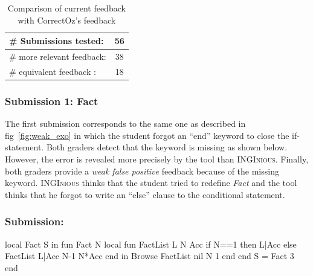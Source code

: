 \documentclass[11pt,a4paper,twoside,openright]{report}
\begin{document}
\begin{table}[!ht]
    \small
  \begin{center}
    \begin{tabular}{lc}
      \toprule
      \# Submissions tested: & 56 \\		%
      \midrule
      \# more relevant feedback: & 38 \\	%
      \midrule
      \# equivalent feedback :& 18 \\	%
      \bottomrule
    \end{tabular}
  \end{center}
  \caption{Comparison of current feedback with CorrectOz's feedback} 
\label{table:compar}
\end{table}


\subsubsection{Submission 1: Fact}
The first submission corresponds to the same one as described in
fig~\ref{fig:weak_exo} in which the student forgot an \enquote{end} 
keyword to close the if-statement. Both graders detect that the keyword is 
missing as shown below. However, the error is revealed more 
precisely by the tool than \textsc{INGInious}. Finally, both graders provide a 
\textit{weak false positive} feedback because of the missing keyword. 
\textsc{INGInious} thinks that the student tried to redefine \textit{Fact} and 
the tool thinks that he forgot to write an \enquote{else} clause to the conditional 
statement.

\subsubsection*{Submission:}
\begin{OZ}
  local Fact S in
      fun {Fact N}
        local
          fun {FactList L N Acc}
            if N==1 then L|Acc
            else {FactList L|Acc N-1 N*Acc}
          end
        in
          {Browse {FactList nil N 1}}
        end
      end
    S = {Fact 3}
  end
\end{OZ}
\newpage
\end{document}

